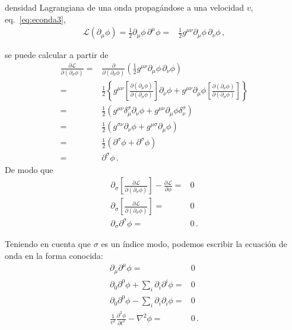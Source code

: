 \begin{frame}
densidad Lagrangiana de una onda propagándose a una velocidad $v$, eq.~\eqref{eq:econda3},
\begin{align}
  \mathcal{L}(\partial_{\mu} \phi)=  \frac{1}{2}{\partial_\mu\phi}\,{\partial^\mu\phi}
  =& \frac{1}{2}g^{\mu\nu}{\partial_\mu\phi}\,{\partial_{\nu}\phi}\,,
\end{align}
\end{frame}
se puede calcular a partir de
\begin{align}
  \frac{\partial\mathcal{L}}{\partial(\partial_{\sigma}\phi)}=&
                                                                \frac{\partial}{\partial(\partial_{\sigma}\phi)} \left( \frac{1}{2}g^{\mu\nu}{\partial_\mu\phi}\,{\partial_{\nu}\phi} \right) \nonumber\\
    =&\frac{1}{2} \left\{  g^{\mu\nu}\left[ \frac{\partial \left( \partial_{\mu}\phi \right)}{\partial \left( \partial_{\sigma}\phi \right)} \right]\partial_{\nu}\phi
     +g^{\mu\nu} \partial_{\mu}\phi \left[ \frac{\partial \left( \partial_{\nu}\phi \right)}{\partial \left( \partial_{\sigma}\phi \right)} \right] \right\} \nonumber\\
    =&\frac{1}{2}\left(  g^{\mu\nu}\delta^{\sigma}_{\mu}\partial_{\nu}\phi
     +  g^{\mu\nu}\partial_{\mu}\phi \delta ^{\sigma}_{\nu}\right) \nonumber\\
    =&\frac{1}{2}\left(  g^{\sigma\nu}\partial_{\nu}\phi
       +  g^{\mu\sigma}\partial_{\mu}\phi \right) \nonumber\\
           =&\frac{1}{2}\left(  \partial^{\sigma}\phi
     + \partial^{\sigma}\phi \right) \nonumber\\
=& \partial^{\sigma}\phi\,.
\end{align}
De modo que
\begin{align}
   \partial_{\sigma} \left[ \frac{\partial\mathcal{L}}{\partial(\partial_{\sigma}\phi)}\right]-\frac{\partial\mathcal{L}}{\partial\phi}=&0 \nonumber\\
  \partial_{\sigma} \left[ \frac{\partial\mathcal{L}}{\partial(\partial_{\sigma}\phi)}\right]=&0 \nonumber\\
       \partial_{\sigma}\partial^{\sigma}\phi=&0 \,.
\end{align}
\begin{frame}
Teniendo en cuenta que $\sigma$ es un índice modo, podemos escribir la ecuación de onda en la forma conocida:
\begin{align}
  \label{eq:onda}
  \partial_{\mu}\partial^{\mu}\phi=&0 \nonumber\\
  \partial_{0}\partial^{0}\phi + \sum_i\partial_{i}\partial^{i}\phi  =&0 \nonumber\\
        \partial_{0}\partial^{0}\phi - \sum_i\partial_{i}\partial_{i}\phi  =&0 \nonumber\\
     \frac{1}{v^2}\frac{\partial^2\phi}{\partial t^2}-\nabla^2\phi=&0\,.
\end{align}
\end{frame}

